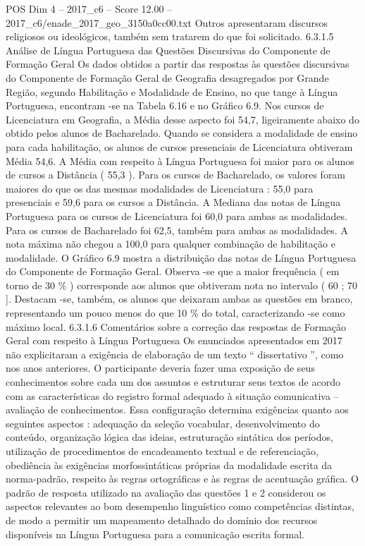 \begin{textsample}{POS Dim 4 – 2017\_c6 – Score 12.00 – 2017\_c6/enade\_2017\_geo\_3150a0cc00.txt}
Outros apresentaram discursos religiosos ou ideológicos, também sem tratarem do que foi solicitado. 6.3.1.5 Análise de Língua Portuguesa das Questões Discursivas do Componente de Formação Geral Os dados obtidos a partir das respostas às questões discursivas do Componente de Formação Geral de Geografia desagregados por Grande Região, segundo Habilitação e Modalidade de Ensino, no que tange à Língua Portuguesa, encontram -se na Tabela 6.16 e no Gráfico 6.9.
Nos cursos de Licenciatura em Geografia, a Média desse aspecto foi 54,7, ligeiramente abaixo do obtido pelos alunos de Bacharelado.
Quando se considera a modalidade de ensino para cada habilitação, os alunos de cursos presenciais de Licenciatura obtiveram Média 54,6.
A Média com respeito à Língua Portuguesa foi maior para os alunos de cursos a Distância ( 55,3 ).
Para os cursos de Bacharelado, os valores foram maiores do que os das mesmas modalidades de Licenciatura : 55,0 para presenciais e 59,6 para os cursos a Distância.
A Mediana das notas de Língua Portuguesa para os cursos de Licenciatura foi 60,0 para ambas as modalidades.
Para os cursos de Bacharelado foi 62,5, também para ambas as modalidades.
A nota máxima não chegou a 100,0 para qualquer combinação de habilitação e modalidade.
O Gráfico 6.9 mostra a distribuição das notas de Língua Portuguesa do Componente de Formação Geral.
Observa -se que a maior frequência ( em torno de 30 \% ) corresponde aos alunos que obtiveram nota no intervalo ( 60 ; 70 ].
Destacam -se, também, os alunos que deixaram ambas as questões em branco, representando um pouco menos do que 10 \% do total, caracterizando -se como máximo local. 6.3.1.6 Comentários sobre a correção das respostas de Formação Geral com respeito à Língua Portuguesa Os enunciados apresentados em 2017 não explicitaram a exigência de elaboração de um texto “ dissertativo ”, como nos anos anteriores.
O participante deveria fazer uma exposição de seus conhecimentos sobre cada um dos assuntos e estruturar seus textos de acordo com as características do registro formal adequado à situação comunicativa – avaliação de conhecimentos.
Essa configuração determina exigências quanto aos seguintes aspectos : adequação da seleção vocabular, desenvolvimento do conteúdo, organização lógica das ideias, estruturação sintática dos períodos, utilização de procedimentos de encadeamento textual e de referenciação, obediência às exigências morfossintáticas próprias da modalidade escrita da norma-padrão, respeito às regras ortográficas e às regras de acentuação gráfica.
O padrão de resposta utilizado na avaliação das questões 1 e 2 considerou os aspectos relevantes ao bom desempenho linguístico como competências distintas, de modo a permitir um mapeamento detalhado do domínio dos recursos disponíveis na Língua Portuguesa para a comunicação escrita formal.

\end{textsample}
